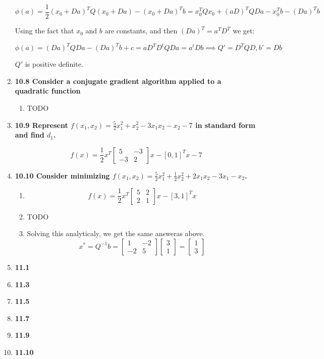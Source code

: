 \documentclass[10pt,a4paper]{article}
\begin{document}
\begin{enumerate}
    $$\phi(a) = \frac{1}{2}(x_0+Da)^TQ(x_0+Da) - (x_0+Da)^Tb = x_0^TQx_0 + (aD)^TQDa - x_0^Tb - (Da)^Tb$$

    Using the fact that $x_0$ and $b$ are constants, and then $(Da)^T = a^TD^T$ we get:

    $$\phi(a) = (Da)^TQDa - (Da)^Tb +c = aD^TD^tQDa = a^tDb \implies Q' = D^TQD, b' = Db$$

    $Q'$ is positive definite.

    \item \textbf{10.8 Consider a conjugate gradient algorithm applied to a quadratic function}
    \begin{enumerate}    
        \item TODO
    \end{enumerate}

    \item \textbf{10.9 Represent $f(x_1, x_2) = \frac{5}{2}x_1^2 +x_2^2 - 3x_1x_2 -x_2 -7$ in standard form and find $d_1$.}
    
    $$f(x) = \frac{1}{2}x^T\begin{bmatrix} 5 & -3 \\ -3 & 2\end{bmatrix}x - [0, 1]^Tx - 7$$

    \item \textbf{10.10 Consider minimizing $f(x_1, x_2) = \frac{5}{2}x_1^2 +\frac{1}{2}x_2^2 + 2x_1x_2 -3x_1 - x_2$.} 
    \begin{enumerate}
        \item $$f(x) = \frac{1}{2}x^T\begin{bmatrix} 5 & 2 \\ 2 & 1\end{bmatrix}x - [3, 1]^Tx$$
        \item TODO
        \item Solving this analyticaly, we get the same answeras above.
        $$x^* = Q^{-1}b = \begin{bmatrix} 1 & -2 \\ -2 & 5\end{bmatrix} \begin{bmatrix} 3 \\ 1\end{bmatrix} = \begin{bmatrix} 1 \\3 \end{bmatrix}$$
    \end{enumerate}

    \item \textbf{11.1 }
    \item \textbf{11.3 }
    \item \textbf{11.5 }
    \item \textbf{11.7 }
    \item \textbf{11.9 }
    \item \textbf{11.10}

\end{enumerate}
\end{document}
